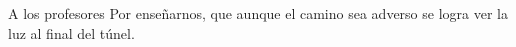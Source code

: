 \begin{acknowledgements}
    A los profesores Por enseñarnos, que aunque el camino sea adverso se logra ver la luz al final del túnel.\\\\

 
\end{acknowledgements}